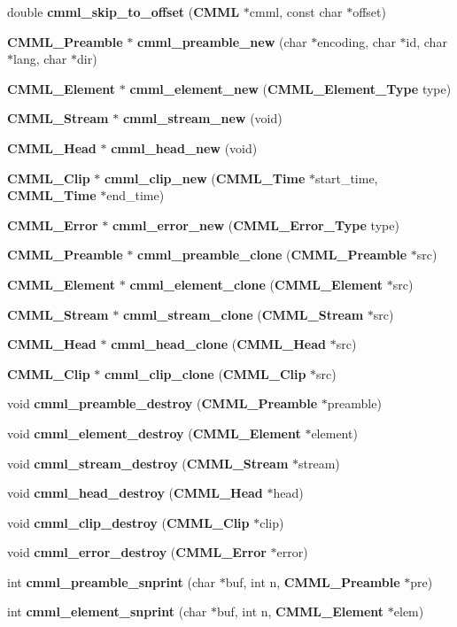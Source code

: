 \begin{CompactItemize}
double {\bf cmml\_\-skip\_\-to\_\-offset} ({\bf CMML} $\ast$cmml, const char $\ast$offset)
\item 
{\bf CMML\_\-Preamble} $\ast$ {\bf cmml\_\-preamble\_\-new} (char $\ast$encoding, char $\ast$id, char $\ast$lang, char $\ast$dir)
\item 
{\bf CMML\_\-Element} $\ast$ {\bf cmml\_\-element\_\-new} ({\bf CMML\_\-Element\_\-Type} type)
\item 
{\bf CMML\_\-Stream} $\ast$ {\bf cmml\_\-stream\_\-new} (void)
\item 
{\bf CMML\_\-Head} $\ast$ {\bf cmml\_\-head\_\-new} (void)
\item 
{\bf CMML\_\-Clip} $\ast$ {\bf cmml\_\-clip\_\-new} ({\bf CMML\_\-Time} $\ast$start\_\-time, {\bf CMML\_\-Time} $\ast$end\_\-time)
\item 
{\bf CMML\_\-Error} $\ast$ {\bf cmml\_\-error\_\-new} ({\bf CMML\_\-Error\_\-Type} type)
\item 
{\bf CMML\_\-Preamble} $\ast$ {\bf cmml\_\-preamble\_\-clone} ({\bf CMML\_\-Preamble} $\ast$src)
\item 
{\bf CMML\_\-Element} $\ast$ {\bf cmml\_\-element\_\-clone} ({\bf CMML\_\-Element} $\ast$src)
\item 
{\bf CMML\_\-Stream} $\ast$ {\bf cmml\_\-stream\_\-clone} ({\bf CMML\_\-Stream} $\ast$src)
\item 
{\bf CMML\_\-Head} $\ast$ {\bf cmml\_\-head\_\-clone} ({\bf CMML\_\-Head} $\ast$src)
\item 
{\bf CMML\_\-Clip} $\ast$ {\bf cmml\_\-clip\_\-clone} ({\bf CMML\_\-Clip} $\ast$src)
\item 
void {\bf cmml\_\-preamble\_\-destroy} ({\bf CMML\_\-Preamble} $\ast$preamble)
\item 
void {\bf cmml\_\-element\_\-destroy} ({\bf CMML\_\-Element} $\ast$element)
\item 
void {\bf cmml\_\-stream\_\-destroy} ({\bf CMML\_\-Stream} $\ast$stream)
\item 
void {\bf cmml\_\-head\_\-destroy} ({\bf CMML\_\-Head} $\ast$head)
\item 
void {\bf cmml\_\-clip\_\-destroy} ({\bf CMML\_\-Clip} $\ast$clip)
\item 
void {\bf cmml\_\-error\_\-destroy} ({\bf CMML\_\-Error} $\ast$error)
\item 
int {\bf cmml\_\-preamble\_\-snprint} (char $\ast$buf, int n, {\bf CMML\_\-Preamble} $\ast$pre)
\item 
int {\bf cmml\_\-element\_\-snprint} (char $\ast$buf, int n, {\bf CMML\_\-Element} $\ast$elem)

\end{CompactItemize}
